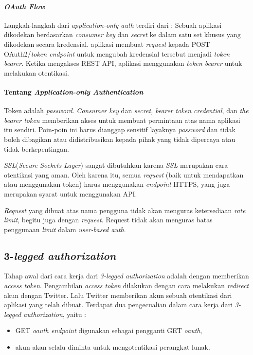 \paragraph{\textit{OAuth Flow}}
Langkah-langkah dari \textit{application-only auth} terdiri dari :
Sebuah aplikasi dikodekan berdasarkan \textit{consumer key} dan \textit{secret} ke dalam satu set khusus yang dikodekan secara kredensial.
aplikasi membuat \textit{request} kepada POST OAuth2/\textit{token endpoint} untuk mengubah kredensial tersebut menjadi \textit{token bearer}.
Ketika mengakses REST API, aplikasi menggunakan \textit{token bearer} untuk melakukan otentikasi.

\paragraph{Tentang \textit{Application-only Authentication}}
Token adalah \textit{password}. \textit{Consumer key} dan \textit{secret, bearer token credential}, dan \textit{the bearer token} memberikan akses untuk membuat permintaan atas nama aplikasi itu sendiri. Poin-poin ini harus dianggap sensitif layaknya \textit{password} dan tidak boleh dibagikan atau didistribusikan kepada pihak yang tidak dipercaya atau tidak berkepentingan.

\textit{SSL}(\textit{Secure Sockets Layer}) sangat dibutuhkan karena \textit{SSL} merupakan cara otentikasi yang aman. Oleh karena itu, semua \textit{request} (baik untuk mendapatkan atau menggunakan token) harus menggunakan \textit{endpoint} HTTPS, yang juga merupakan syarat untuk menggunakan API.

\textit{Request} yang dibuat atas nama pengguna tidak akan menguras ketersediaan \textit{rate limit}, begitu juga dengan \textit{request}. Request tidak akan menguras batas penggunaan \textit{limit} dalam \textit{user-based auth}.


\subsection{3-\textit{legged authorization}}
Tahap awal dari cara kerja dari \textit{3-legged authorization} adalah dengan memberikan \textit{access token}. Pengambilan \textit{access token} dilakukan dengan cara melakukan \textit{redirect} akun dengan Twitter. Lalu Twitter memberikan akun sebuah otentikasi dari aplikasi yang telah dibuat. Terdapat dua pengecualian dalam cara kerja dari \textit{3-legged authorization}, yaitu :

\begin{itemize}
	\item GET \textit{oauth endpoint} digunakan sebagai pengganti GET \textit{oauth},
	\item akun akan selalu diminta untuk mengotentikasi perangkat lunak.
\end{itemize}

